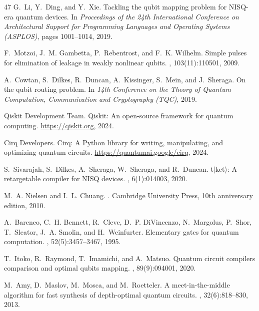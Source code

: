 \documentclass[sigconf,nonacm]{acmart}
\begin{document}
\begin{thebibliography}{47}
G.~Li, Y.~Ding, and Y.~Xie.
\newblock Tackling the qubit mapping problem for {NISQ}-era quantum devices.
\newblock In {\em Proceedings of the 24th International Conference on Architectural Support for Programming Languages and Operating Systems (ASPLOS)}, pages 1001--1014, 2019.

F.~Motzoi, J.~M. Gambetta, P.~Rebentrost, and F.~K. Wilhelm.
\newblock Simple pulses for elimination of leakage in weakly nonlinear qubits.
, 103(11):110501, 2009.

A.~Cowtan, S.~Dilkes, R.~Duncan, A.~Kissinger, S.~Mein, and J.~Sheraga.
\newblock On the qubit routing problem.
\newblock In {\em 14th Conference on the Theory of Quantum Computation, Communication and Cryptography (TQC)}, 2019.

{Qiskit Development Team}.
\newblock Qiskit: An open-source framework for quantum computing.
\newblock \url{https://qiskit.org}, 2024.

{Cirq Developers}.
\newblock Cirq: A {P}ython library for writing, manipulating, and optimizing quantum circuits.
\newblock \url{https://quantumai.google/cirq}, 2024.

S.~Sivarajah, S.~Dilkes, A.~Sheraga, W.~Sheraga, and R.~Duncan.
\newblock t$|$ket$\rangle$: A retargetable compiler for {NISQ} devices.
, 6(1):014003, 2020.

M.~A. Nielsen and I.~L. Chuang.
.
\newblock Cambridge University Press, 10th anniversary edition, 2010.

A.~Barenco, C.~H. Bennett, R.~Cleve, D.~P. DiVincenzo, N.~Margolus, P.~Shor, T.~Sleator, J.~A. Smolin, and H.~Weinfurter.
\newblock Elementary gates for quantum computation.
, 52(5):3457--3467, 1995.

T.~Itoko, R.~Raymond, T.~Imamichi, and A.~Matsuo.
\newblock Quantum circuit compilers comparison and optimal qubits mapping.
, 89(9):094001, 2020.

M.~Amy, D.~Maslov, M.~Mosca, and M.~Roetteler.
\newblock A meet-in-the-middle algorithm for fast synthesis of depth-optimal quantum circuits.
, 32(6):818--830, 2013.


\end{thebibliography}
\end{document}
